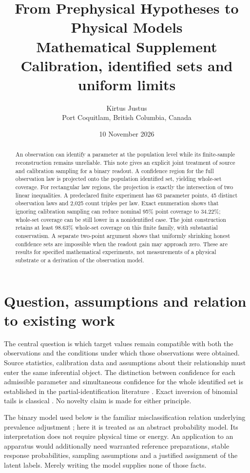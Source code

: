 \documentclass[11pt,a4paper]{article}
\title{\color{ink}\sffamily From Prephysical Hypotheses to Physical Models\\[7pt]\Large Mathematical Supplement\\[7pt]\large Calibration, identified sets and uniform limits}
\author{Kirtus Justus\\\small Port Coquitlam, British Columbia, Canada}
\date{10 November 2026}
\theoremstyle{definition}\newtheorem{definition}[theorem]{Definition}
\begin{document}
\maketitle
\begin{abstract}
An observation can identify a parameter at the population level while its finite-sample reconstruction remains unreliable. This note gives an explicit joint treatment of source and calibration sampling for a binary readout. A confidence region for the full observation law is projected onto the population identified set, yielding whole-set coverage. For rectangular law regions, the projection is exactly the intersection of two linear inequalities. A predeclared finite experiment has 63 parameter points, 45 distinct observation laws and 2,025 count triples per law. Exact enumeration shows that ignoring calibration sampling can reduce nominal 95\% point coverage to 34.22\%; whole-set coverage can be still lower in a nonidentified case. The joint construction retains at least 98.63\% whole-set coverage on this finite family, with substantial conservatism. A separate two-point argument shows that uniformly shrinking honest confidence sets are impossible when the readout gain may approach zero. These are results for specified mathematical experiments, not measurements of a physical substrate or a derivation of the observation model.
\end{abstract}
\begingroup
\setlength{\parskip}{0pt}
\tableofcontents
\endgroup
\newpage
\section{Question, assumptions and relation to existing work}

The central question is which target values remain compatible with both the observations and the conditions under which those observations were obtained. Source statistics, calibration data and assumptions about their relationship must enter the same inferential object. The distinction between confidence for each admissible parameter and simultaneous confidence for the whole identified set is established in the partial-identification literature \cite{imbens,romano}. Exact inversion of binomial tails is classical \cite{clopper}. No novelty claim is made for either principle.

The binary model used below is the familiar misclassification relation underlying prevalence adjustment \cite{rogan}; here it is treated as an abstract probability model. Its interpretation does not require physical time or energy. An application to an apparatus would additionally need warranted reference preparations, stable response probabilities, sampling assumptions and a justified assignment of the latent labels. Merely writing the model supplies none of those facts.
\end{document}
